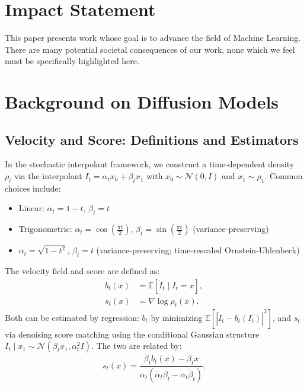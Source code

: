 \documentclass{article}
\theoremstyle{plain}
\theoremstyle{definition}
\theoremstyle{remark}
\begin{document}

\section*{Impact Statement}

This paper presents work whose goal is to advance the field of Machine Learning. There are many potential societal consequences of our work, none which we feel must be specifically highlighted here.




\newpage
\appendix
\onecolumn

\section{Background on Diffusion Models} \label{app:diff}

\subsection{Velocity and Score: Definitions and Estimators}

In the stochastic interpolant framework, we construct a time-dependent density $\rho_t$ via the interpolant $I_t = \alpha_t x_0 + \beta_t x_1$ with $x_0 \sim \mathcal{N}(0, I)$ and $x_1 \sim \rho_1$. Common choices include:
\begin{itemize}
    \item Linear: $\alpha_t = 1-t$, $\beta_t = t$
    \item Trigonometric: $\alpha_t = \cos(\tfrac{\pi t}{2})$, $\beta_t = \sin(\tfrac{\pi t}{2})$ (variance-preserving)
    \item $\alpha_t = \sqrt{1-t^2}$, $\beta_t = t$ (variance-preserving; time-rescaled Ornstein-Uhlenbeck)
\end{itemize}
The velocity field and score are defined as:
\begin{align}
    b_t(x) &= \mathbb{E}[\dot{I}_t \mid I_t = x], \\
    s_t(x) &= \nabla \log \rho_t(x).
\end{align}
Both can be estimated by regression: $b_t$ by minimizing $\mathbb{E}[|\dot{I}_t - b_t(I_t)|^2]$, and $s_t$ via denoising score matching using the conditional Gaussian structure $I_t \mid x_1 \sim \mathcal{N}(\beta_t x_1, \alpha_t^2 I)$.
The two are related by:
\begin{equation}
    s_t(x) = \frac{\beta_t b_t(x) - \dot{\beta}_t x}{\alpha_t(\dot{\alpha}_t \beta_t - \alpha_t \dot{\beta}_t)}.
\end{equation}
\end{document}
